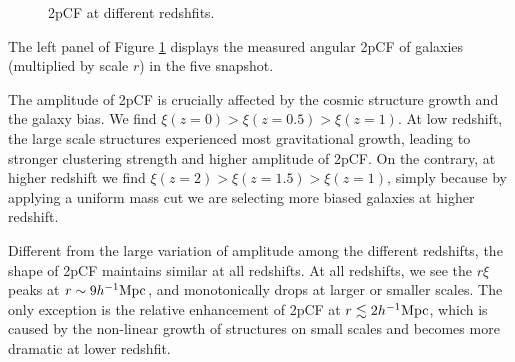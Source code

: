 \documentclass[iop]{emulateapj}
\begin{document}
\begin{figure}
   \caption{\label{fig_diffz}
  2pCF at different redshfits.
   }
\end{figure}

The left panel of Figure \ref{fig_diffz} displays the measured angular 2pCF of galaxies (multiplied by scale $r$) in the five snapshot.

The amplitude of 2pCF is crucially affected by the cosmic structure growth and the galaxy bias.
We find $\xi(z=0)>\xi(z=0.5)>\xi(z=1)$.
At low redshift, the large scale structures experienced most gravitational growth,
leading to stronger clustering strength and higher amplitude of 2pCF.
On the contrary, at higher redshift we find $\xi(z=2)>\xi(z=1.5)>\xi(z=1)$,
simply because by applying a uniform mass cut we are selecting more biased galaxies at higher redshift.

Different from the large variation of amplitude among the different redshifts, %
the shape of 2pCF maintains similar at all redshifts. 
At all redshifts, we see the $r\xi$ peaks at $r\sim9 h^{-1}\rm Mpc$,
and monotonically drops at larger or smaller scales.
The only exception is the relative enhancement of 2pCF at $r\lesssim 2 h^{-1}\rm Mpc$,
which is caused by the non-linear growth of structures on small scales 
and becomes more dramatic at lower redshfit.
\end{document}
